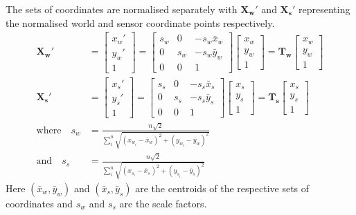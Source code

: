 \documentclass[12pt,oneside,openany,a4paper, %
english, %
masters-t, goldenblock]{usthesis}
\begin{document}
The sets of coordinates are normalised separately  with $\bm{X_{w}'}$ and $\bm{X_{s}'}$ representing the normalised world and sensor coordinate points respectively.
\begin{align}
  \bm{X_{w}'} &= 
  \begin{bmatrix}
  x_w' \\
  y_w' \\
  1
  \end{bmatrix}  = 
  \begin{bmatrix}
  s_w & 0 & -s_w \bar{x}_w \\
  0 & s_w & -s_w \bar{y}_w \\
  0 & 0 & 1
  \end{bmatrix} 
  \begin{bmatrix}
  x_w \\
  y_w \\
  1
  \end{bmatrix} =
  \bm{T_w} 
  \begin{bmatrix}
  x_w \\
  y_w \\
  1
  \end{bmatrix} \\
  \bm{X_{s}'} &= 
  \begin{bmatrix}
  x_s' \\
  y_s' \\
  1
  \end{bmatrix}  = 
  \begin{bmatrix}
  s_s & 0 & -s_s \bar{x}_s \\
  0 & s_s & -s_s \bar{y}_s \\
  0 & 0 & 1
  \end{bmatrix} 
  \begin{bmatrix}
  x_s \\
  y_s \\
  1
  \end{bmatrix} =
  \bm{T_s}
  \begin{bmatrix}
  x_s \\
  y_s \\
  1
  \end{bmatrix} \\
  \text{where} \quad s_w &=\frac{n\sqrt{2}}{\sum_i^n \sqrt{(x_{w_i}-\bar{x}_w)^2+(y_{w_i}-\bar{y}_w)^2}} \\
  \text{and} \quad s_s &=\frac{n\sqrt{2}}{\sum_i^n \sqrt{(x_{s_i}-\bar{x}_s)^2+(y_{s_i}-\bar{y}_s)^2}}
\end{align}
Here $(\bar{x}_w,\bar{y}_w)$ and $(\bar{x}_s,\bar{y}_s)$ are the centroids of the respective sets of coordinates and $s_w$ and $s_s$ are the scale factors.
\end{document}
